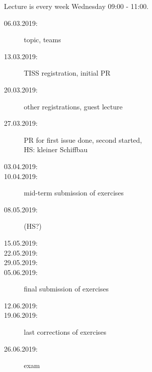 

\date{20.03.2019}



\renewcommand{\enquote}[1]{\emph{``#1''}} %

\begin{frame}
	\titlepage
	\doclicenseThis
\end{frame}

\begin{frame}
	Lecture is every week Wednesday 09:00 - 11:00.

	\begin{description}
		\item[06.03.2019:] {\color{gray}topic, teams}
		\item[13.03.2019:] {\color{gray}TISS registration, initial PR}
		\item[20.03.2019:] {\color{red}other registrations, guest lecture}
		\item[27.03.2019:] {\color{orange}PR for first issue done, second started, \\ HS: kleiner Schiffbau}
		\item[03.04.2019:]
		\item[10.04.2019:] mid-term submission of exercises
		\item[08.05.2019:] (HS?)
		\item[15.05.2019:]
		\item[22.05.2019:]
		\item[29.05.2019:]
		\item[05.06.2019:] final submission of exercises
		\item[12.06.2019:]
		\item[19.06.2019:] last corrections of exercises
		\item[26.06.2019:] exam
	\end{description}
\end{frame}

